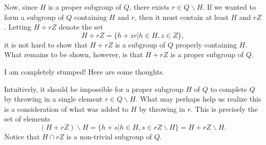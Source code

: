 \documentclass[12pt]{article}
\begin{document}
Now, since $H$ is a proper subgroup of $Q$, there exists $r\in Q\backslash H$.
If we wanted to form a subgroup of $Q$ containing $H$ and $r$, then it must
contain at least $H$ and $rZ$.  Letting $H+rZ$ denote the set
\begin{equation*}
H+rZ=\{h+zr|h\in H,z\in Z\},
\end{equation*}
it is not hard to show that $H+rZ$ is a subgroup of $Q$ properly containing $H$.
What remains to be shown, however, is that $H+rZ$ is a proper subgroup of $Q$.

I am completely stumped!  Here are some thoughts.

Intuitively, it should be impossible for a proper subgroup $H$ of $Q$ to
complete $Q$ by throwing in a single element $r\in Q\backslash H$.
What may perhaps help us realize this is a consideration of what was
added to $H$ by throwing in $r$.  This is precisely the set of
elements
\begin{equation*}
(H+rZ)\backslash H = \{h+s|h\in H,s\in rZ\backslash H\} = H+rZ\backslash H.
\end{equation*}
Notice that $H\cap rZ$ is a non-trivial subgroup of $Q$.
\end{document}
